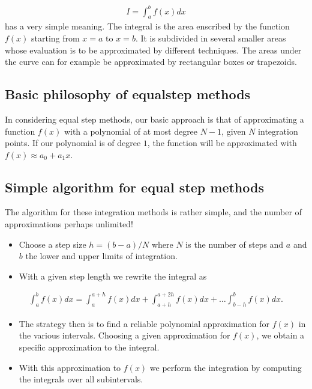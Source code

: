 \documentclass[letterpaper,10pt,english]{sphinxmanual}
\begin{document}
\begin{equation*}
\begin{split}
\begin{equation}
   I=\int_a^bf(x) dx
\label{eq:integraldef} \tag{17}
\end{equation}
\end{split}
\end{equation*}
has a very simple meaning. The integral is the
area enscribed by the function \(f(x)\) starting from \(x=a\) to  \(x=b\). It is subdivided in several smaller areas whose evaluation is to  be approximated by different techniques. The areas under the curve can for example  be approximated by rectangular boxes or trapezoids.




\subsection{Basic philosophy of equal\sphinxhyphen{}step methods}
\label{\detokenize{chapter3:basic-philosophy-of-equal-step-methods}}
In considering equal step  methods, our basic approach is that of approximating
a function \(f(x)\) with a polynomial of at most
degree \(N-1\), given \(N\) integration points. If our polynomial is of degree \(1\),
the function will be approximated with \(f(x)\approx a_0+a_1x\).




\subsection{Simple algorithm for equal step methods}
\label{\detokenize{chapter3:simple-algorithm-for-equal-step-methods}}
The algorithm for these integration methods  is rather simple, and the number of approximations perhaps  unlimited!
\begin{itemize}
\item {} 
Choose a step size \(h=(b-a)/N\)  where \(N\) is the number of steps and \(a\) and \(b\) the lower and upper limits of integration.

\item {} 
With a given step length we rewrite the integral as

\end{itemize}
\begin{equation*}
\begin{split}
\int_a^bf(x) dx= \int_a^{a+h}f(x)dx + \int_{a+h}^{a+2h}f(x)dx+\dots \int_{b-h}^{b}f(x)dx.
\end{split}
\end{equation*}\begin{itemize}
\item {} 
The strategy then is to find a reliable polynomial approximation   for \(f(x)\) in the various intervals.  Choosing a given approximation for  \(f(x)\), we obtain a specific approximation to the  integral.

\item {} 
With this approximation to \(f(x)\) we perform the integration by computing the integrals over all subintervals.

\end{itemize}
\end{document}
